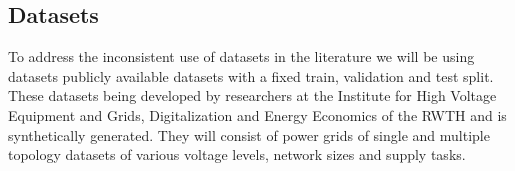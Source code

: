 \subsection*{Datasets}

To address the inconsistent use of datasets in the literature we will be using
datasets publicly available datasets with a fixed train, validation and test split.
These datasets being developed by researchers at the Institute for High Voltage
Equipment and Grids, Digitalization and Energy Economics of the RWTH and is
synthetically generated.
They will consist of power grids of single and multiple topology datasets of various
voltage levels, network sizes and supply tasks.